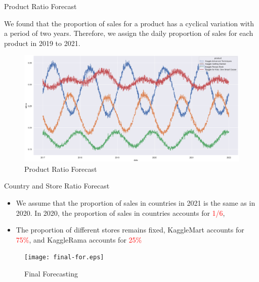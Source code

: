\documentclass[
 size=14pt,
 paper=smartboard,  %
 mode=present, 		%
 display=slides, 	%
 style=tuliplab,  	%
 pauseslide,
 fleqn,leqno]{powerdot}
\begin{document}
\begin{slide}[toc=,bm=]{Product Ratio Forecast}

	We found that the proportion of sales for a product has a cyclical variation with a period of two years. Therefore, we assign the daily proportion of sales for each product in 2019 to 2021.
	\begin{figure}
		\centering
		\includegraphics[scale=0.38]{product-ratio-for.eps}
		\caption{Product Ratio Forecast}\label{fig:OutAspect-target}
	\end{figure}
	
\end{slide}
\begin{slide}[toc=,bm=]{Country and Store Ratio Forecast}
\begin{itemize}
	\item We assume that the proportion of sales in countries in 2021 is the same as in 2020. In 2020, the proportion of sales in countries accounts for \textcolor{red}{1/6},
	\item The proportion of different stores remains fixed, KaggleMart accounts for \textcolor{red}{75\%}, and KaggleRama accounts for \textcolor{red}{25\%}
\end{itemize}
	\begin{figure}
		\centering
		\texttt{[image: final-for.eps]}
		\caption{Final Forecasting}\label{fig:OutAspect-target}
	\end{figure}
	
\end{slide}
\end{document}
